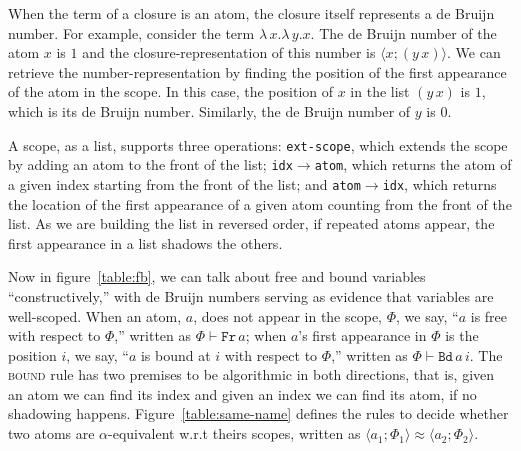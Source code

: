 \documentclass[a4paper,UKenglish]{lipics-v2016}
\newcommand{\clos}[2] {
  \langle #1; #2 \rangle
}
\newcommand{\aeq}[4] {
  \clos{#1}{#2} \approx \clos{#3}{#4}
}
\newcommand*{\transname}[1]{\textsc{#1}}
\begin{document}
When the term of a closure is an atom, the closure itself represents a
de Bruijn number.  For example, consider the term
$\lambda\,x.\lambda\,y.x$. The de Bruijn number of the atom $x$ is $1$
and the closure-representation of this number is $\clos{x}{(y\,x)}$.
We can retrieve the number-representation by finding the
position of the first appearance of the atom in the scope. In this
case, the position of $x$ in the list $(y\,x)$ is $1$, which is its de
Bruijn number. Similarly, the de Bruijn number of $y$ is $0$.

A scope, as a list, supports three operations:
\texttt{ext-scope}, which extends the scope by adding an atom to the front of the list;
\texttt{idx$\rightarrow$atom}, which returns the atom of a given index starting from the front of the list;
and \texttt{atom$\rightarrow$idx}, which returns the location of the first appearance of a given atom counting from the front of the list.
As we are building the list in reversed order, if repeated atoms appear, the first appearance in a list shadows the others.

Now in figure~\ref{table:fb}, we can talk about free and bound variables ``constructively,''
with de Bruijn numbers serving as evidence that variables are well-scoped.
When an atom, $a$, does not appear in the scope, $\Phi$,
we say, ``$a$ is free with respect to $\Phi$,'' written as $\Phi \vdash \texttt{Fr}\, a$;
when $a$'s first appearance in $\Phi$ is the position $i$,
we say, ``$a$ is bound at $i$ with respect to $\Phi$,'' written as $\Phi \vdash \texttt{Bd}\, a\,i$.
The \transname{bound} rule has two premises to be algorithmic in both directions,
that is, given an atom we can find its index
and given an index we can find its atom, if no shadowing happens.
Figure~\ref{table:same-name} defines the rules to decide whether two atoms are $\alpha$-equivalent w.r.t theirs scopes,
written as $\aeq{a_1}{\Phi_1}{a_2}{\Phi_2}$.
\end{document}
